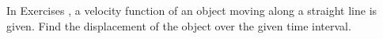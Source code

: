 {\noindent In Exercises}
{, a velocity function of an object moving along a straight line is given. Find the displacement of the object over the given time interval.
}
